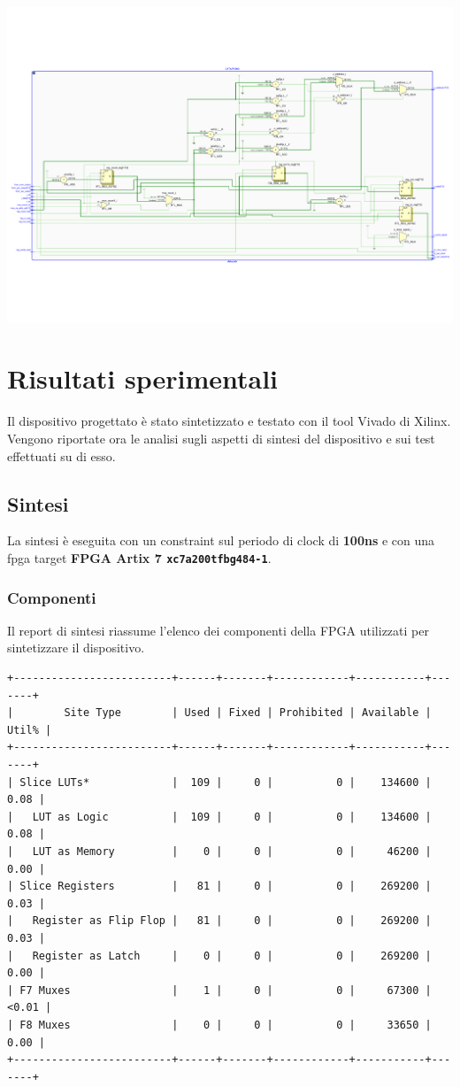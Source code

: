 \documentclass[a4paper]{report}
\begin{document}
\includegraphics[scale = 0.45]{schematics/datapath.pdf}


\chapter{Risultati sperimentali}
Il dispositivo progettato è stato sintetizzato e testato con il tool Vivado di Xilinx. Vengono riportate ora le analisi sugli aspetti di sintesi del dispositivo e sui test effettuati su di esso.

\section{Sintesi}
La sintesi è eseguita con un constraint sul periodo di clock di \textbf{100ns} e con una fpga target \textbf{FPGA Artix 7 \texttt{xc7a200tfbg484-1}}.
\subsection{Componenti}
Il report di sintesi riassume l'elenco dei componenti della FPGA utilizzati per sintetizzare il dispositivo.

\begin{verbatim}
+-------------------------+------+-------+------------+-----------+-------+
|        Site Type        | Used | Fixed | Prohibited | Available | Util% |
+-------------------------+------+-------+------------+-----------+-------+
| Slice LUTs*             |  109 |     0 |          0 |    134600 |  0.08 |
|   LUT as Logic          |  109 |     0 |          0 |    134600 |  0.08 |
|   LUT as Memory         |    0 |     0 |          0 |     46200 |  0.00 |
| Slice Registers         |   81 |     0 |          0 |    269200 |  0.03 |
|   Register as Flip Flop |   81 |     0 |          0 |    269200 |  0.03 |
|   Register as Latch     |    0 |     0 |          0 |    269200 |  0.00 |
| F7 Muxes                |    1 |     0 |          0 |     67300 | <0.01 |
| F8 Muxes                |    0 |     0 |          0 |     33650 |  0.00 |
+-------------------------+------+-------+------------+-----------+-------+
\end{verbatim}
\end{document}
